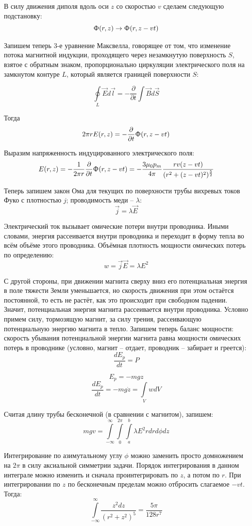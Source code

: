 \documentclass[a4paper,12pt]{article} %
\begin{document}
В силу движения диполя вдоль оси $z$ со скоростью $v$ сделаем следующую подстановку:
$$\Upphi(r,z) \rightarrow \Upphi(r, z - vt)$$

Запишем теперь 3-е уравнение Максвелла, говорящее от том, что изменение потока магнитной индукции, проходящего через незамкнутую поверхность $S$, взятое с обратным знаком, пропорционально циркуляции электрического поля на замкнутом контуре $L$, который является границей поверхности $S$:

$$\oint\limits_{L} \overrightarrow{E}d\overrightarrow{l} = -\dfrac{\partial}{\partial t}\int \overrightarrow{B} d\overrightarrow{S}$$

Тогда
$$2\pi rE(r, z) = -\dfrac{\partial}{\partial t}\Upphi(r, z - vt)$$

Выразим напряженность индуцированного электрического поля:
$$E(r,z) = -\dfrac{1}{2\pi r} \dfrac{\partial}{\partial t}\Upphi(r, z - vt) = -\dfrac{3\mu_0 p_m}{4\pi} \dfrac{rv(z - vt)}{(r^2 + (z - vt)^2)^\frac{5}{2}}$$

Теперь запишем закон Ома для текущих по поверхности трубы вихревых токов Фуко с плотностью $j$; проводимость меди -- $\lambda$:
$$\overrightarrow{j} = \lambda \overrightarrow{E}$$

Электрический ток вызывает омические потери внутри проводника. Иными словами, энергия рассеивается внутри проводника и переходит в форму тепла во всём объёме этого проводника. Объёмная плотность мощности омических потерь по определению: 
$$w = \overrightarrow{j} \overrightarrow{E} = \lambda E^2$$

С другой стороны, при движении магнита сверху вниз его потенциальная энергия в поле тяжести Земли уменьшается, но скорость движения при этом остаётся постоянной, то есть не растёт, как это происходит при свободном падении. Значит, потенциальная энергия магнита рассеивается внутри проводника. Условно примем силу, тормозящую магнит, за силу трения, рассеивающую потенциальную энергию магнита в тепло. Запишем теперь баланс мощности: скорость убывания потенциальной энергии магнита равна мощности омических потерь в проводнике (условно, магнит -- отдает, проводник -- забирает и греется):
$$\dfrac{dE_p}{dt} = P$$

$$E_p = -mgz$$ 
$$\dfrac{dE_p}{dt} = -mg\dot{z} = \int\limits_{V}wdV$$

Считая длину трубы бесконечной (в сравнении с магнитом), запишем:
$$mgv = \int\limits_{-\infty}^{\infty}\int\limits_{0}^{2\pi}\int\limits_{a}^{b}\lambda E^2 rdrd\phi dz$$

Интегрирование по азимутальному углу $\phi$ можно заменить просто домножением на $2\pi$ в силу аксиальной симметрии задачи. Порядок интегрирования в данном интеграле можно изменить и сначала проинтегрировать по $z$, а потом по $r$. При интегрировании по $z$ по бесконечным пределам можно отбросить слагаемое $-vt$. Тогда:
$$\int\limits_{-\infty}^{\infty}\dfrac{z^2 dz}{(r^2 + z^2)^5} = \dfrac{5\pi}{128r^7}$$
\end{document}
